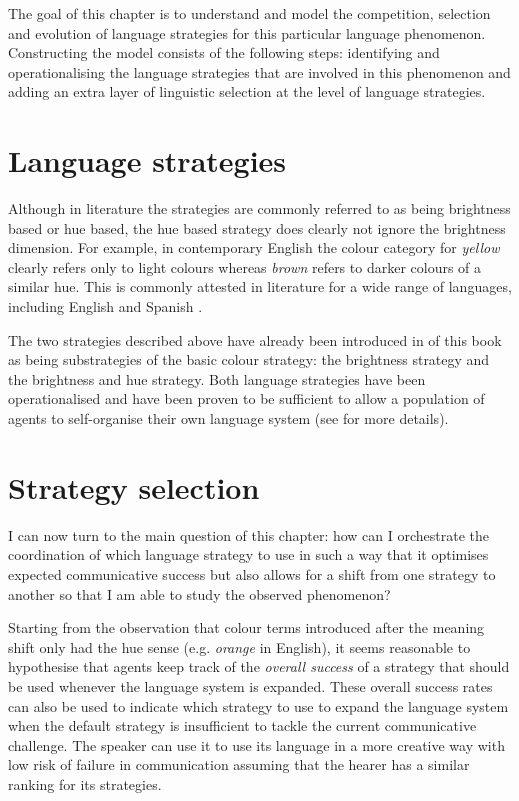 The goal of this chapter is to understand and model the competition,
selection and evolution of language strategies for this particular
language phenomenon. Constructing the model consists of the following
steps: identifying and operationalising the language strategies that
are involved in this phenomenon and adding an extra layer of
linguistic selection at the level of language strategies.

\section{Language strategies}

Although in literature the strategies are commonly referred to as
being brightness based or hue based, the hue based strategy does
clearly not ignore the brightness dimension. For example, in
contemporary English the colour category for \textit{yellow} clearly refers
only to light colours whereas \textit{brown} refers to darker colours of a
similar hue. This is commonly attested in literature for a wide range
of languages, including English \citep{sturges95location,
  boynton97insights} and Spanish \citep{lillo07locating}.

The two strategies described above have already been introduced in
 of this book as being substrategies
of the basic colour strategy: the brightness strategy
and the brightness and hue strategy. Both language strategies
have been operationalised and have been proven to be sufficient to
allow a population of agents to self-organise their own language
system (see  for more details).

\section{Strategy selection}

I can now turn to the main question of this chapter: how can I
orchestrate the coordination of which language strategy to use in such
a way that it optimises expected communicative success but also allows
for a shift from one strategy to another so that I am able to study
the observed phenomenon?

Starting from the observation that colour terms introduced after the
meaning shift only had the hue sense (e.g. \textit{orange} in English), it
seems reasonable to hypothesise that agents keep track of the
\emph{overall success} of a strategy that should be used whenever the
language system is expanded. These overall success rates can also be
used to indicate which strategy to use to expand the language system
when the default strategy is insufficient to tackle the current
communicative challenge. The speaker can use it to use its language in
a more creative way with low risk of failure in communication assuming
that the hearer has a similar ranking for its strategies.

